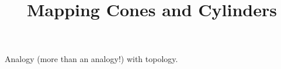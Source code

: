 \documentclass{ximera}
\title{Mapping Cones and Cylinders}
\begin{document}
\begin{abstract}
  
\end{abstract}
\maketitle

Analogy (more than an analogy!) with topology.
\end{document}
